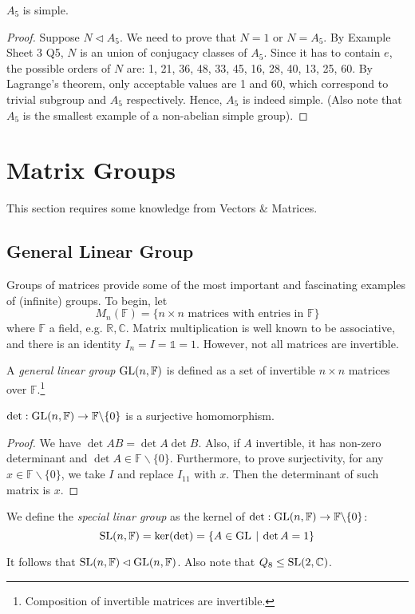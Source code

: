 \documentclass[10pt, a4paper, twoside]{report}
\begin{document}
\begin{theorem}
    \(A_5\) is simple.
\end{theorem}
\begin{proof}
    Suppose \(N\lhd A_5\). We need to prove that \(N=1\) or \(N=A_5\). By Example Sheet 3 Q5, \(N\) is an union of conjugacy classes of \(A_5\). Since it has to contain \(e\), the possible orders of \(N\) are: 1, 21, 36, 48, 33, 45, 16, 28, 40, 13, 25, 60. By Lagrange's theorem, only acceptable values are 1 and 60, which correspond to trivial subgroup and \(A_5\) respectively. Hence, \(A_5\) is indeed simple. (Also note that \(A_5\) is the smallest example of a non-abelian simple group).
\end{proof}
\section{Matrix Groups}
This section requires some knowledge from Vectors \& Matrices.
\subsection{General Linear Group}
Groups of matrices provide some of the most important and fascinating examples of (infinite) groups. To begin, let 
\[M_n(\mathbb{F})=\{n\times n\text{  matrices with entries in  }\mathbb{F}\}\]
where \(\mathbb{F}\) a field, e.g. \(\mathbb{R},\mathbb{C}\). Matrix multiplication is well known to be associative, and there is an identity \(I_n=I=\mathbb{1}=1\). However, not all matrices are invertible.
\begin{definition}
    A \emph{general linear group} \(\operatorname{GL}(n,\mathbb{F})\) is defined as a set of invertible \(n\times n\) matrices over \(\mathbb{F}\).\footnote{Composition of invertible matrices are invertible.}
\end{definition}
\begin{proposition}
    \(\det:\operatorname{GL}(n,\mathbb{F})\to\mathbb{F}\backslash\{0\}\) is a surjective homomorphism.
\end{proposition}
\begin{proof}
    We have \(\det AB=\det A\det B\). Also, if \(A\) invertible, it has non-zero determinant and \(\det A\in\mathbb{F}\backslash\{0\}\). Furthermore, to prove surjectivity, for any \(x\in\mathbb{F}\backslash\{0\}\), we take \(I\) and replace \(I_{11}\) with \(x\). Then the determinant of such matrix is \(x\).
\end{proof}
\begin{definition}
    We define the \emph{special linar group} as the kernel of \(\det:\operatorname{GL}(n,\mathbb{F})\to\mathbb{F}\backslash\{0\}\):
    \[\operatorname{SL}(n,\mathbb{F})=\ker(\det)=\{A\in\operatorname{GL}\:|\:\det A=1\}\]
\end{definition}
It follows that \(\operatorname{SL}(n,\mathbb{F})\lhd\operatorname{GL}(n,\mathbb{F})\). Also note that \(Q_8\leq\operatorname{SL}(2,\mathbb{C})\).
\end{document}
